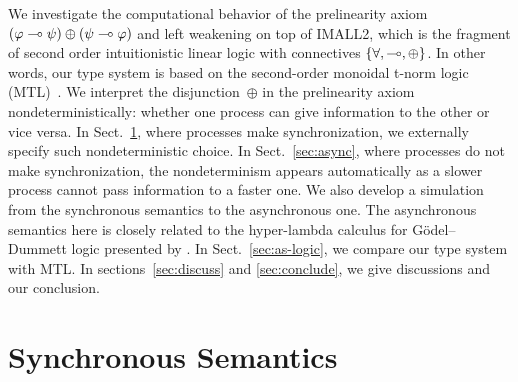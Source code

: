 \documentclass[envcountsame]{llncs}
\begin{document}
We investigate the computational behavior of the prelinearity axiom
$(\varphi\multimap\psi)\oplus(\psi\multimap\varphi)$ and left weakening
on top of IMALL2, which is the fragment of second order
intuitionistic linear logic with connectives $\{\forall, \multimap,
\oplus\}$.  In other words, our type system is based on the second-order
monoidal t-norm logic (MTL)~\citep{Esteva2001271}.
We interpret the disjunction~$\oplus$ in the prelinearity axiom
nondeterministically: whether
one process can give information to the other or
vice versa.
In Sect.~\ref{sec:sync}, where processes make synchronization,
we externally specify such nondeterministic choice.
In Sect.~\ref{sec:async}, where processes do not make synchronization,
the nondeterminism appears automatically as a slower process cannot pass
information to a faster one.
%
We also
develop a simulation from the synchronous semantics to the
asynchronous one.
The asynchronous semantics here is closely related to
the hyper-lambda calculus for G\"odel--Dummett logic presented by
\citet{hiraiflops2012}.
%
In Sect.~\ref{sec:as-logic}, we compare our type system with MTL.
In sections~\ref{sec:discuss} and \ref{sec:conclude}, we give discussions
and our conclusion.

\section{Synchronous Semantics}
\label{sec:sync}
\end{document}
